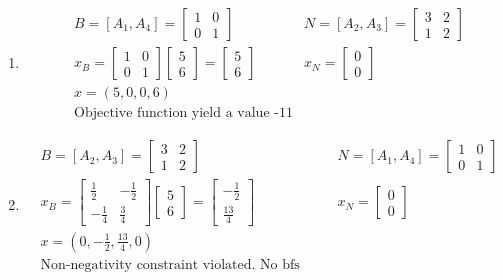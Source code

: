\documentclass[11pt]{article}
\begin{document}
\begin{enumerate}
    \item \begin{align*}
        & B = [A_1, A_4] = \begin{bmatrix} 1 & 0 \\ 0 & 1\end{bmatrix}& N = [A_2, A_3] =\begin{bmatrix} 3 & 2 \\ 1 & 2\end{bmatrix}\\    
        & x_B = \begin{bmatrix} 1 & 0 \\ 0 & 1\end{bmatrix} \begin{bmatrix} 5 \\ 6 \end{bmatrix} = \begin{bmatrix} 5 \\ 6 \end{bmatrix} & x_N = \begin{bmatrix} 0 \\ 0\end{bmatrix} \\
        & x = (5, 0, 0, 6) & \\
        & \text{Objective function yield a value -11} &
    \end{align*}
    
    \item \begin{align*}
        & B = [A_2, A_3]=\begin{bmatrix} 3 & 2 \\ 1 & 2\end{bmatrix} & N = [A_1, A_4]= \begin{bmatrix} 1 & 0 \\ 0 & 1\end{bmatrix}\\
        & x_B = \begin{bmatrix} \frac{1}{2} & -\frac{1}{2} \\ -\frac{1}{4} & \frac{3}{4}\end{bmatrix} \begin{bmatrix} 5 \\ 6 \end{bmatrix} = \begin{bmatrix}  -\frac{1}{2}\\ \frac{13}{4} \end{bmatrix} & x_N = \begin{bmatrix} 0 \\ 0\end{bmatrix} \\
        & x = (0, -\frac{1}{2}, \frac{13}{4}, 0) &\\
        & \text{Non-negativity constraint violated. No bfs generated.} &
    \end{align*}
    

\end{enumerate}
\end{document}
